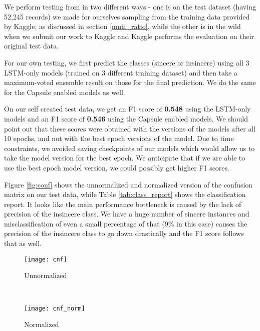 \documentclass[11pt,twocolumn,letterpaper]{article}
\begin{document}
We perform testing from in two different ways - one is on the test dataset (having 52,245 records) we made for ourselves sampling from the training data provided by Kaggle, as discussed in section \ref{muti_ratio}, while the other is in the wild when we submit our work to Kaggle and Kaggle performs the evaluation on their original test data.

For our own testing, we first predict the classes (sincere or insincere) using all 3 LSTM-only models (trained on 3 different training dataset) and then take a maximum-voted ensemble result on those for the final prediction. We do the same for the Capsule enabled models as well.

On our self created test data, we get an F1 score of \textbf{0.548} using the LSTM-only models and an F1 score of \textbf{0.546} using the Capsule enabled models. We should point out that these scores were obtained with the versions of the models after all 10 epochs, and not with the best epoch versions of the model. Due to time constraints, we avoided saving checkpoints of our models which would allow us to take the model version for the best epoch. We anticipate that if we are able to use the best epoch model version, we could possibly get higher F1 scores.

Figure \ref{fig:conf} shows the unnormalized  and normalized version of the confusion matrix on our test data, while Table \ref{tab:class_report} shows the classification report. It looks like the main performance bottleneck is caused by the lack of precision of the insincere class. We have a huge number of sincere instances and misclassification of even a small percentage of that (9\% in this case) causes the precision of the insincere class to go down drastically and the F1 score follows that as well.

\begin{figure*}[!htb]
     \centering
     \begin{subfigure}[t]{0.4\textwidth}
         \texttt{[image: cnf]}
         \caption{Unnormalized}
         \label{fig:rnn}
     \end{subfigure}%
     ~
     \begin{subfigure}[t]{0.4\textwidth}
         \texttt{[image: cnf\_norm]}
         \caption{Normalized}
         \label{fig:lstm}
     \end{subfigure}
        \caption{Confusion Matrix}
        \label{fig:conf}
\end{figure*} 
\end{document}
